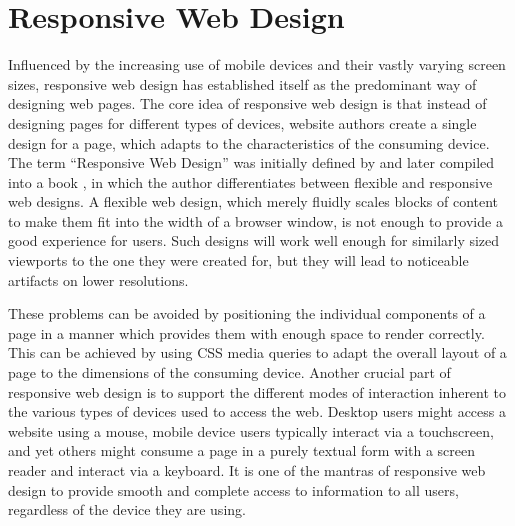 \section{Responsive Web Design}
\label{sec:RWD}

Influenced by the increasing use of mobile devices and their vastly
varying screen sizes, responsive web design has established itself as
the predominant way of designing web pages. The core idea of
responsive web design is that instead of designing pages for different
types of devices, website authors create a single design for a page,
which adapts to the characteristics of the consuming device. The term
\enquote{Responsive Web Design} was initially defined by
\textcite{Marcotte-ALA-RWD} and later compiled into a book
\parencite{ResponsiveWebDesign}, in which the author differentiates
between flexible and responsive web designs. A flexible web design,
which merely fluidly scales blocks of content to make them fit into
the width of a browser window, is not enough to provide a good
experience for users. Such designs will work well enough for similarly
sized viewports to the one they were created for, but they will lead
to noticeable artifacts on lower resolutions.

These problems can be avoided by positioning the individual components
of a page in a manner which provides them with enough space to render
correctly. This can be achieved by using CSS media queries to adapt
the overall layout of a page to the dimensions of the consuming
device. Another crucial part of responsive web design is to support
the different modes of interaction inherent to the various types of
devices used to access the web. Desktop users might access a website
using a mouse, mobile device users typically interact via a
touchscreen, and yet others might consume a page in a purely textual
form with a screen reader and interact via a keyboard. It is one of
the mantras of responsive web design to provide smooth and complete
access to information to all users, regardless of the device they are
using.